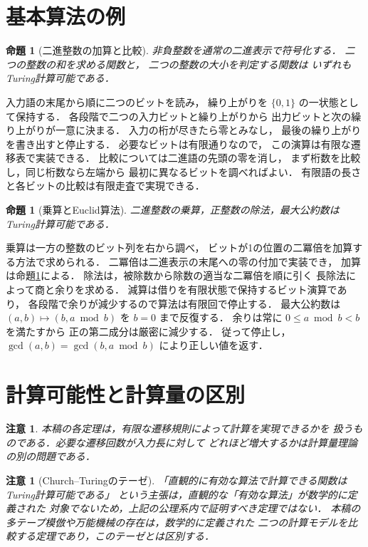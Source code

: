 \documentclass[a5paper,10pt,onecolumn]{jsarticle}
\makeatletter
\theoremstyle{mathnotetheorem}
\newtheorem{proposition}[theorem]{命題}
\newtheorem{remark}[theorem]{注意}
\renewcommand{\proofname}{証明}
\renewenvironment{proof}[1][\proofname]{%
  \par\pushQED{\qed}\normalfont\topsep4\p@\@plus2\p@\relax
  \trivlist\item[\hskip\labelsep\bfseries #1]\ignorespaces
}{\popQED\endtrivlist\@endpefalse}
\makeatother
\begin{document}
\section{基本算法の例}
\begin{proposition}[二進整数の加算と比較]\label{prop:binary}
非負整数を通常の二進表示で符号化する．
二つの整数の和を求める関数と，
二つの整数の大小を判定する関数は
いずれもTuring計算可能である．
\end{proposition}
\begin{proof}
入力語の末尾から順に二つのビットを読み，
繰り上がりを $\{0,1\}$ の一状態として保持する．
各段階で二つの入力ビットと繰り上がりから
出力ビットと次の繰り上がりが一意に決まる．
入力の桁が尽きたら零とみなし，
最後の繰り上がりを書き出すと停止する．
必要なビットは有限通りなので，
この演算は有限な遷移表で実装できる．
比較については二進語の先頭の零を消し，
まず桁数を比較し，同じ桁数なら左端から
最初に異なるビットを調べればよい．
有限語の長さと各ビットの比較は有限走査で実現できる．
\end{proof}
\begin{proposition}[乗算とEuclid算法]
二進整数の乗算，正整数の除法，最大公約数は
Turing計算可能である．
\end{proposition}
\begin{proof}
乗算は一方の整数のビット列を右から調べ，
ビットが1の位置の二冪倍を加算する方法で求められる．
二冪倍は二進表示の末尾への零の付加で実装でき，
加算は命題\ref{prop:binary}による．
除法は，被除数から除数の適当な二冪倍を順に引く
長除法によって商と余りを求める．
減算は借りを有限状態で保持するビット演算であり，
各段階で余りが減少するので算法は有限回で停止する．
最大公約数は
$(a,b)\mapsto(b,a\bmod b)$ を $b=0$ まで反復する．
余りは常に $0\le a\bmod b<b$ を満たすから
正の第二成分は厳密に減少する．
従って停止し，
$\gcd(a,b)=\gcd(b,a\bmod b)$ により正しい値を返す．
\end{proof}
\section{計算可能性と計算量の区別}
\begin{remark}
本稿の各定理は，有限な遷移規則によって計算を実現できるかを
扱うものである．必要な遷移回数が入力長に対して
どれほど増大するかは計算量理論の別の問題である．
\end{remark}
\begin{remark}[Church--Turingのテーゼ]
「直観的に有効な算法で計算できる関数はTuring計算可能である」
という主張は，直観的な「有効な算法」が数学的に定義された
対象でないため，上記の公理系内で証明すべき定理ではない．
本稿の多テープ模倣や万能機械の存在は，数学的に定義された
二つの計算モデルを比較する定理であり，このテーゼとは区別する．
\end{remark}
\end{document}

